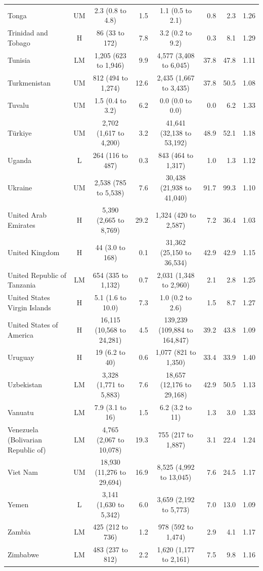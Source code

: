 \begin{longtable}{lccrcrrr}
Tonga & UM & 2.3 (0.8 to 4.8) & 1.5 & 1.1 (0.5 to 2.1) & 0.8 & 2.3 & 1.26 \\
Trinidad and Tobago & H & 86 (33 to 172) & 7.8 & 3.2 (0.2 to 9.2) & 0.3 & 8.1 & 1.29 \\
Tunisia & LM & 1,205 (623 to 1,946) & 9.9 & 4,577 (3,408 to 6,045) & 37.8 & 47.8 & 1.11 \\
Turkmenistan & UM & 812 (494 to 1,274) & 12.6 & 2,435 (1,667 to 3,435) & 37.8 & 50.5 & 1.08 \\
Tuvalu & UM & 1.5 (0.4 to 3.2) & 6.2 & 0.0 (0.0 to 0.0) & 0.0 & 6.2 & 1.33 \\
Türkiye & UM & 2,702 (1,617 to 4,200) & 3.2 & 41,641 (32,138 to 53,192) & 48.9 & 52.1 & 1.18 \\
Uganda & L & 264 (116 to 487) & 0.3 & 843 (464 to 1,317) & 1.0 & 1.3 & 1.12 \\
Ukraine & UM & 2,538 (785 to 5,538) & 7.6 & 30,438 (21,938 to 41,040) & 91.7 & 99.3 & 1.10 \\
United Arab Emirates & H & 5,390 (2,665 to 8,769) & 29.2 & 1,324 (420 to 2,587) & 7.2 & 36.4 & 1.03 \\
United Kingdom & H & 44 (3.0 to 168) & 0.1 & 31,362 (25,150 to 36,534) & 42.9 & 42.9 & 1.15 \\
United Republic of Tanzania & LM & 654 (335 to 1,132) & 0.7 & 2,031 (1,348 to 2,960) & 2.1 & 2.8 & 1.25 \\
United States Virgin Islands & H & 5.1 (1.6 to 10.0) & 7.3 & 1.0 (0.2 to 2.6) & 1.5 & 8.7 & 1.27 \\
United States of America & H & 16,115 (10,568 to 24,281) & 4.5 & 139,239 (109,884 to 164,847) & 39.2 & 43.8 & 1.09 \\
Uruguay & H & 19 (6.2 to 40) & 0.6 & 1,077 (821 to 1,350) & 33.4 & 33.9 & 1.40 \\
Uzbekistan & LM & 3,328 (1,771 to 5,883) & 7.6 & 18,657 (12,176 to 29,168) & 42.9 & 50.5 & 1.13 \\
Vanuatu & LM & 7.9 (3.1 to 16) & 1.5 & 6.2 (3.2 to 11) & 1.3 & 3.0 & 1.33 \\
Venezuela (Bolivarian Republic of) & LM & 4,765 (2,067 to 10,078) & 19.3 & 755 (217 to 1,887) & 3.1 & 22.4 & 1.24 \\
Viet Nam & UM & 18,930 (11,276 to 29,694) & 16.9 & 8,525 (4,992 to 13,045) & 7.6 & 24.5 & 1.17 \\
Yemen & L & 3,141 (1,630 to 5,342) & 6.0 & 3,659 (2,192 to 5,773) & 7.0 & 13.0 & 1.09 \\
Zambia & LM & 425 (212 to 736) & 1.2 & 978 (592 to 1,474) & 2.9 & 4.1 & 1.17 \\
Zimbabwe & LM & 483 (237 to 812) & 2.2 & 1,620 (1,177 to 2,161) & 7.5 & 9.8 & 1.16 \\
\end{longtable}
